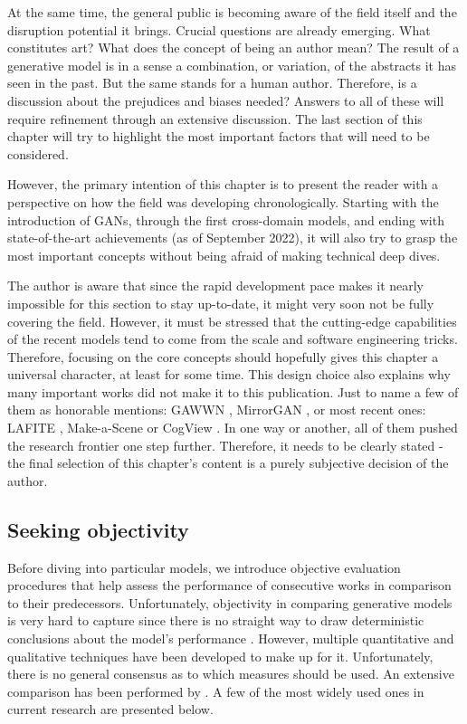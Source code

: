 \documentclass[
]{krantz}
\begin{document}
At the same time, the general public is becoming aware of the field itself and the disruption potential it brings. Crucial questions are already emerging. What constitutes art? What does the concept of being an author mean? The result of a generative model is in a sense a combination, or variation, of the abstracts it has seen in the past. But the same stands for a human author. Therefore, is a discussion about the prejudices and biases needed? Answers to all of these will require refinement through an extensive discussion. The last section of this chapter will try to highlight the most important factors that will need to be considered.

However, the primary intention of this chapter is to present the reader with a perspective on how the field was developing chronologically. Starting with the introduction of GANs, through the first cross-domain models, and ending with state-of-the-art achievements (as of September 2022), it will also try to grasp the most important concepts without being afraid of making technical deep dives.

The author is aware that since the rapid development pace makes it nearly impossible for this section to stay up-to-date, it might very soon not be fully covering the field. However, it must be stressed that the cutting-edge capabilities of the recent models tend to come from the scale and software engineering tricks. Therefore, focusing on the core concepts should hopefully gives this chapter a universal character, at least for some time. This design choice also explains why many important works did not make it to this publication. Just to name a few of them as honorable mentions: GAWWN \citep{GAWWN2016}, MirrorGAN \citep{MirrorGAN2019}, or most recent ones: LAFITE \citep{LAFITE2021}, Make-a-Scene \citep{MakeAScene2022} or CogView \citep{CogView2021}. In one way or another, all of them pushed the research frontier one step further. Therefore, it needs to be clearly stated - the final selection of this chapter's content is a purely subjective decision of the author.

\hypertarget{seeking-objectivity}{%
\subsection{Seeking objectivity}\label{seeking-objectivity}}

Before diving into particular models, we introduce objective evaluation procedures that help assess the performance of consecutive works in comparison to their predecessors. Unfortunately, objectivity in comparing generative models is very hard to capture since there is no straight way to draw deterministic conclusions about the model's performance \citep{Evaluation2015}. However, multiple quantitative and qualitative techniques have been developed to make up for it. Unfortunately, there is no general consensus as to which measures should be used. An extensive comparison has been performed by \citet{EvaluationComparison2018}. A few of the most widely used ones in current research are presented below.
\end{document}
